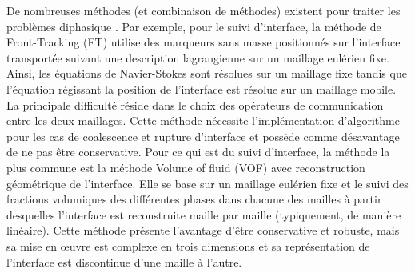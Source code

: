 
De nombreuses méthodes (et combinaison de méthodes) existent pour traiter les problèmes diphasique \cites{mirjalili_interface-capturing_nodate,boniou_comparison_2022}. Par exemple, pour le suivi d'interface, la méthode de Front-Tracking (FT) utilise des marqueurs sans masse positionnés sur l'interface transportée suivant une description lagrangienne sur un maillage eulérien fixe. Ainsi, les équations de Navier-Stokes sont résolues sur un maillage fixe tandis que l'équation régissant la position de l'interface est résolue sur un maillage mobile. La principale difficulté réside dans le choix des opérateurs de communication entre les deux maillages. Cette méthode nécessite l'implémentation d'algorithme pour les cas de coalescence et rupture d'interface et possède comme désavantage de ne pas être conservative. Pour ce qui est du suivi d'interface, la méthode la plus commune est la méthode Volume of fluid (VOF) avec reconstruction géométrique de l'interface. Elle se base sur un maillage eulérien fixe et le suivi des fractions volumiques des différentes phases dans chacune des mailles à partir desquelles l'interface est reconstruite maille par maille (typiquement, de manière linéaire). Cette méthode présente l'avantage d'être conservative et robuste, mais sa mise en \oe uvre est complexe en trois dimensions et sa représentation de l'interface est discontinue d'une maille à l'autre.


